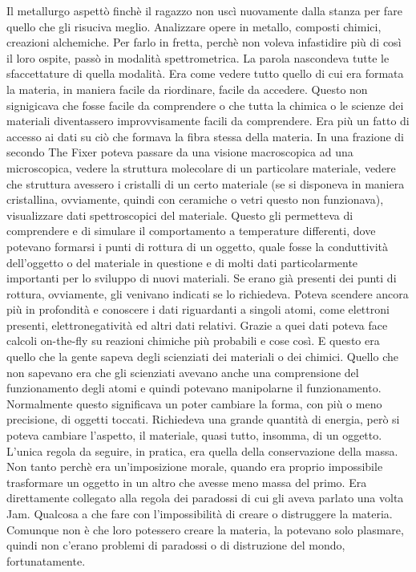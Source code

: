     Il metallurgo aspettò finchè il ragazzo non uscì nuovamente dalla
    stanza per fare quello che gli risuciva meglio. Analizzare opere in
    metallo, composti chimici, creazioni alchemiche. Per farlo in fretta,
    perchè non voleva infastidire più di così il loro ospite, passò in
    modalità spettrometrica. La parola nascondeva tutte le sfaccettature
    di quella modalità. Era come vedere tutto quello di cui era formata la
    materia, in maniera facile da riordinare, facile da accedere. Questo
    non signigicava che fosse facile da comprendere o che tutta la chimica
    o le scienze dei materiali diventassero improvvisamente facili da
    comprendere. Era più un fatto di accesso ai dati su ciò che formava la
    fibra stessa della materia. In una frazione di secondo The Fixer poteva
    passare da una visione macroscopica ad una microscopica, vedere la
    struttura molecolare di un particolare materiale, vedere che
    struttura avessero i cristalli di un certo materiale (se si disponeva
    in maniera cristallina, ovviamente, quindi con ceramiche o vetri questo
    non funzionava), visualizzare dati spettroscopici del materiale.
    Questo gli permetteva di comprendere e di simulare il
    comportamento a temperature differenti, dove potevano formarsi i
    punti di rottura di un oggetto, quale fosse la conduttività
    dell'oggetto o del materiale in questione e di molti dati
    particolarmente importanti per lo sviluppo di nuovi materiali. Se erano
    già presenti dei punti di rottura, ovviamente, gli
    venivano indicati se lo richiedeva. Poteva scendere ancora più in profondità e conoscere i dati
    riguardanti a singoli atomi, come elettroni presenti, elettronegatività
    ed altri dati relativi. Grazie a quei dati poteva face calcoli
    on-the-fly su reazioni chimiche più probabili e cose così. E questo era
    quello che la gente sapeva degli scienziati dei materiali o dei
    chimici. Quello che non sapevano era che gli scienziati avevano anche
    una comprensione del funzionamento degli atomi e quindi potevano
    manipolarne il funzionamento. Normalmente questo significava un poter
    cambiare la forma, con più o meno precisione, di oggetti toccati.
    Richiedeva una grande quantità di energia, però si poteva cambiare
    l'aspetto, il materiale, quasi tutto, insomma, di un oggetto. L'unica
    regola da seguire, in pratica, era quella della conservazione della
    massa. Non tanto perchè era un'imposizione morale, quando era proprio
    impossibile trasformare un oggetto in un altro che avesse meno massa
    del primo. Era direttamente collegato alla regola dei paradossi di cui
    gli aveva parlato una volta Jam. Qualcosa a che fare con
    l'impossibilità di creare o distruggere la materia. Comunque non è che
    loro potessero creare la materia, la potevano solo plasmare, quindi non
    c'erano problemi di paradossi o di distruzione del mondo,
    fortunatamente.

